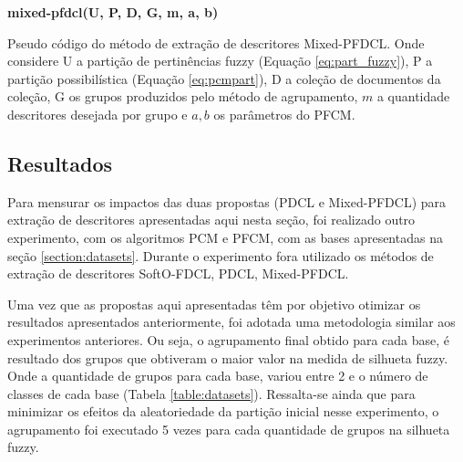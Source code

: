 \begin{algorithm}[H] 
  \SetAlgoLined 
  \textbf{{\color{blue}mixed-pfdcl}(U, P, D, G, m, a, b)}\\
  \caption{Pseudo código do método de extração de descritores Mixed-PFDCL. Onde
    considere U a
  partição de pertinências fuzzy (Equação \ref{eq:part_fuzzy}), P a partição
  possibilística (Equação \ref{eq:pcmpart}), D a coleção de documentos da coleção, G os grupos
produzidos pelo método de agrupamento, $m$ a quantidade descritores desejada por grupo e $a,b$ os
parâmetros do PFCM.}
\label{alg:mixedpfdcl} 
\end{algorithm}

\subsection{Resultados}

Para mensurar os impactos das duas propostas (PDCL e Mixed-PFDCL) para extração de descritores apresentadas
aqui nesta seção, foi realizado outro experimento, com os algoritmos PCM e PFCM, com as bases
apresentadas na seção \ref{section:datasets}. Durante o experimento fora utilizado os métodos de
extração de descritores SoftO-FDCL, PDCL, Mixed-PFDCL. 

Uma vez que as propostas aqui apresentadas têm por objetivo otimizar os resultados apresentados
anteriormente, foi adotada uma metodologia similar aos experimentos anteriores. Ou seja, o agrupamento
final obtido para cada base, é resultado dos grupos que obtiveram o maior valor na medida de
silhueta fuzzy. Onde a quantidade de grupos para cada base, variou entre 2 e o número de classes
de cada base (Tabela \ref{table:datasets}). Ressalta-se ainda que para minimizar os efeitos da
aleatoriedade da partição inicial nesse experimento, o agrupamento foi executado 5 vezes para cada
quantidade de grupos na silhueta fuzzy. 

